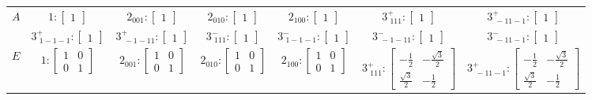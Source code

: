\documentclass[fleqn,8pt,landscape]{jsarticle}
\begin{document}
\begin{longtable}{ccccccc}
$ A $ & $ 1:\begin{bmatrix} 1 \end{bmatrix} $ & $ 2{}_{001}:\begin{bmatrix} 1 \end{bmatrix} $ & $ 2{}_{010}:\begin{bmatrix} 1 \end{bmatrix} $ & $ 2{}_{100}:\begin{bmatrix} 1 \end{bmatrix} $ & $ 3^{+}_{\,\,111}:\begin{bmatrix} 1 \end{bmatrix} $ & $ 3^{+}_{\,\,-11-1}:\begin{bmatrix} 1 \end{bmatrix} $ \\
& $ 3^{+}_{\,\,1-1-1}:\begin{bmatrix} 1 \end{bmatrix} $ & $ 3^{+}_{\,\,-1-11}:\begin{bmatrix} 1 \end{bmatrix} $ & $ 3^{-}_{\,\,111}:\begin{bmatrix} 1 \end{bmatrix} $ & $ 3^{-}_{\,\,1-1-1}:\begin{bmatrix} 1 \end{bmatrix} $ & $ 3^{-}_{\,\,-1-11}:\begin{bmatrix} 1 \end{bmatrix} $ & $ 3^{-}_{\,\,-11-1}:\begin{bmatrix} 1 \end{bmatrix} $ \\ \hline
$ E $ & $ 1:\begin{bmatrix} 1 & 0 \\ 0 & 1 \end{bmatrix} $ & $ 2{}_{001}:\begin{bmatrix} 1 & 0 \\ 0 & 1 \end{bmatrix} $ & $ 2{}_{010}:\begin{bmatrix} 1 & 0 \\ 0 & 1 \end{bmatrix} $ & $ 2{}_{100}:\begin{bmatrix} 1 & 0 \\ 0 & 1 \end{bmatrix} $ & $ 3^{+}_{\,\,111}:\begin{bmatrix} - \frac{1}{2} & - \frac{\sqrt{3}}{2} \\ \frac{\sqrt{3}}{2} & - \frac{1}{2} \end{bmatrix} $ & $ 3^{+}_{\,\,-11-1}:\begin{bmatrix} - \frac{1}{2} & - \frac{\sqrt{3}}{2} \\ \frac{\sqrt{3}}{2} & - \frac{1}{2} \end{bmatrix} $ \\

\end{longtable}
\end{document}
